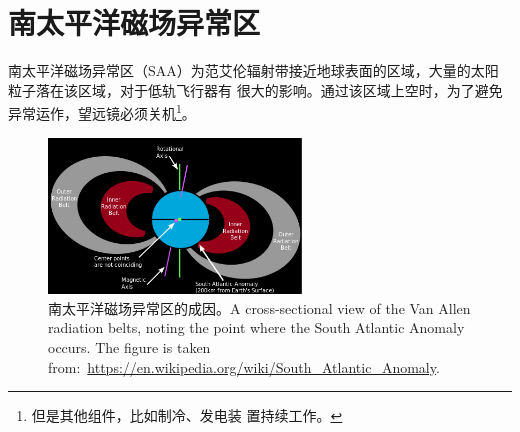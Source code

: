
\section{南太平洋磁场异常区}
南太平洋磁场异常区（SAA）为范艾伦辐射带接近地球表面的区域，大量的太阳粒子落在该区域，对于低轨飞行器有
很大的影响。通过该区域上空时，为了避免异常运作，望远镜必须关机\footnote{但是其他组件，比如制冷、发电装
置持续工作。}。

\begin{figure}
\centering
\includegraphics[width=0.6\textwidth,angle=0]{figs/South_Atlantic_Anomaly.png}
\caption{南太平洋磁场异常区的成因。A cross-sectional view of the Van Allen radiation belts, noting
the point where the South Atlantic Anomaly occurs. The figure is taken
from:~\url{https://en.wikipedia.org/wiki/South_Atlantic_Anomaly}.}
\label{fig:saad1}
\end{figure}

